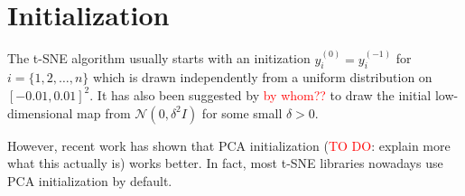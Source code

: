 \section{Initialization}
The t-SNE algorithm usually starts with an initization $y_i^{(0)} = y_i^{(-1)}$ for $i=\{1, 2, \dots, n\}$ which is drawn independently from a uniform distribution on $[-0.01, 0.01]^2$. It has also been suggested by \textcolor{red}{by whom??} to draw the initial low-dimensional map from $\mathcal{N}(0, \delta^2 I)$ for some small $\delta > 0$. 

However, recent work \cite{kobak21} has shown that PCA initialization (\textcolor{red}{TO DO}: explain more what this actually is) works better. In fact, most t-SNE libraries nowadays use PCA initialization by default. 
